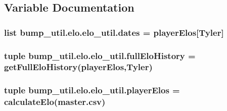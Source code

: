 \subsection{Variable Documentation}
\hypertarget{namespacebump__util_1_1elo_1_1elo__util_a444fb8e398767896cae1b9bdba47aff8}{}
\subsubsection[{dates}]{\setlength{\rightskip}{0pt plus 5cm}list bump\+\_\+util.\+elo.\+elo\+\_\+util.\+dates = {\bf player\+Elos}\mbox{[}\textquotesingle{}Tyler\textquotesingle{}\mbox{]}}\label{namespacebump__util_1_1elo_1_1elo__util_a444fb8e398767896cae1b9bdba47aff8}
\hypertarget{namespacebump__util_1_1elo_1_1elo__util_a8f3f6c9505d9bffc58e28f8e6ec1ba4e}{}
\subsubsection[{full\+Elo\+History}]{\setlength{\rightskip}{0pt plus 5cm}tuple bump\+\_\+util.\+elo.\+elo\+\_\+util.\+full\+Elo\+History = {\bf get\+Full\+Elo\+History}({\bf player\+Elos},\textquotesingle{}Tyler\textquotesingle{})}\label{namespacebump__util_1_1elo_1_1elo__util_a8f3f6c9505d9bffc58e28f8e6ec1ba4e}
\hypertarget{namespacebump__util_1_1elo_1_1elo__util_ad86bc16b39f702552f41a83c392584ab}{}
\subsubsection[{player\+Elos}]{\setlength{\rightskip}{0pt plus 5cm}tuple bump\+\_\+util.\+elo.\+elo\+\_\+util.\+player\+Elos = {\bf calculate\+Elo}(\textquotesingle{}master.\+csv\textquotesingle{})}\label{namespacebump__util_1_1elo_1_1elo__util_ad86bc16b39f702552f41a83c392584ab}
\hypertarget{namespacebump__util_1_1elo_1_1elo__util_a15699928188d60536539e4b3acee209d}{}
